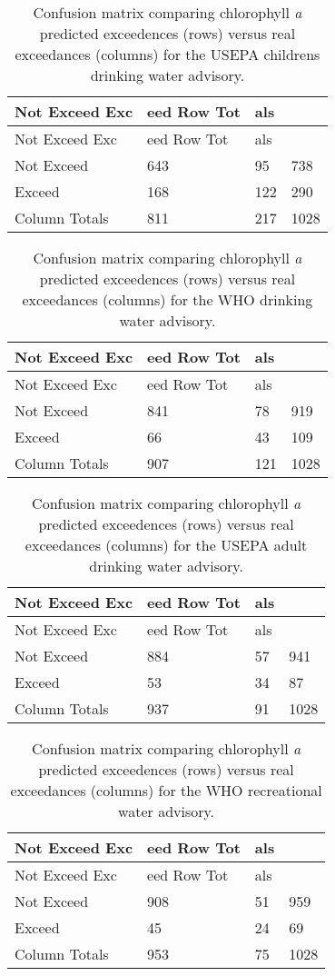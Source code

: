 \documentclass[11pt,]{article}
\begin{document}
\newpage

\begin{longtable}[c]{@{}llll@{}}
\caption{Confusion matrix comparing chlorophyll \textit{a} predicted
exceedences (rows) versus real exceedances (columns) for the USEPA
childrens drinking water advisory.
\label{tab:child_conmat_table}}\tabularnewline
\toprule
Not Exceed Exc & eed Row Tot & als &\tabularnewline
\midrule
\endfirsthead
\toprule
Not Exceed Exc & eed Row Tot & als &\tabularnewline
\midrule
\endhead
Not Exceed & 643 & 95 & 738\tabularnewline
Exceed & 168 & 122 & 290\tabularnewline
Column Totals & 811 & 217 & 1028\tabularnewline
\bottomrule
\end{longtable}

\newpage

\begin{longtable}[c]{@{}llll@{}}
\caption{Confusion matrix comparing chlorophyll \textit{a} predicted
exceedences (rows) versus real exceedances (columns) for the WHO
drinking water advisory.
\label{tab:who_drink_conmat_table}}\tabularnewline
\toprule
Not Exceed Exc & eed Row Tot & als &\tabularnewline
\midrule
\endfirsthead
\toprule
Not Exceed Exc & eed Row Tot & als &\tabularnewline
\midrule
\endhead
Not Exceed & 841 & 78 & 919\tabularnewline
Exceed & 66 & 43 & 109\tabularnewline
Column Totals & 907 & 121 & 1028\tabularnewline
\bottomrule
\end{longtable}

\newpage

\begin{longtable}[c]{@{}llll@{}}
\caption{Confusion matrix comparing chlorophyll \textit{a} predicted
exceedences (rows) versus real exceedances (columns) for the USEPA adult
drinking water advisory. \label{tab:adult_conmat_table}}\tabularnewline
\toprule
Not Exceed Exc & eed Row Tot & als &\tabularnewline
\midrule
\endfirsthead
\toprule
Not Exceed Exc & eed Row Tot & als &\tabularnewline
\midrule
\endhead
Not Exceed & 884 & 57 & 941\tabularnewline
Exceed & 53 & 34 & 87\tabularnewline
Column Totals & 937 & 91 & 1028\tabularnewline
\bottomrule
\end{longtable}

\newpage

\begin{longtable}[c]{@{}llll@{}}
\caption{Confusion matrix comparing chlorophyll \textit{a} predicted
exceedences (rows) versus real exceedances (columns) for the WHO
recreational water advisory.
\label{tab:who_rec_conmat_table}}\tabularnewline
\toprule
Not Exceed Exc & eed Row Tot & als &\tabularnewline
\midrule
\endfirsthead
\toprule
Not Exceed Exc & eed Row Tot & als &\tabularnewline
\midrule
\endhead
Not Exceed & 908 & 51 & 959\tabularnewline
Exceed & 45 & 24 & 69\tabularnewline
Column Totals & 953 & 75 & 1028\tabularnewline
\bottomrule
\end{longtable}
\end{document}
